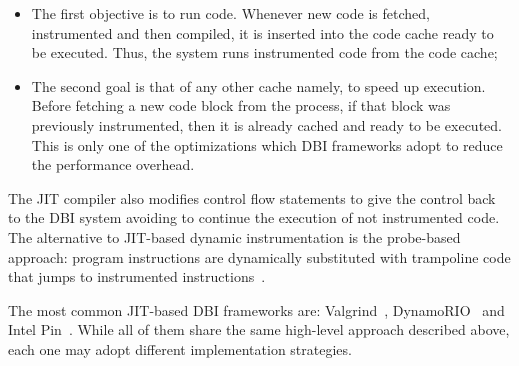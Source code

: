 \documentclass[LaM,binding=0.6cm]{sapthesis}
\begin{document}
\begin{itemize}
\item The first objective is to run code. Whenever new code is fetched, instrumented and then compiled, it is inserted into the code cache ready to be executed. Thus, the system runs instrumented code from the code cache;
\item The second goal is that of any other cache namely, to speed up execution. Before fetching a new code block from the process, if that block was previously instrumented, then it is already cached and ready to be executed. This is only one of the optimizations which DBI frameworks adopt to reduce the performance overhead.
\end{itemize}
The JIT compiler also modifies control flow statements to give the control back to the DBI system avoiding to continue the execution of not instrumented code. The alternative to JIT-based dynamic instrumentation is the probe-based approach: program instructions are dynamically substituted with trampoline code that jumps to instrumented instructions~\cite{buck2000api}.

The most common JIT-based DBI frameworks are: Valgrind~\cite{nethercote2007valgrind}, DynamoRIO~\cite{bruening2012transparent} and Intel Pin~\cite{luk2005pin}. While all of them share the same high-level approach described above, each one may adopt different implementation strategies.
\end{document}
